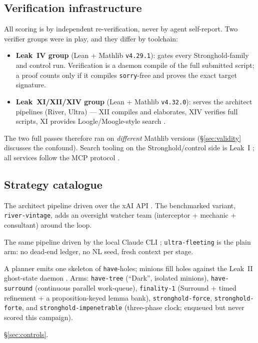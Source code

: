 \documentclass[12pt, a4paper]{article}
\newcommand{\run}[1]{\texttt{#1}}
\begin{document}
\subsection{Verification infrastructure}
\label{sec:verifiers}

All scoring is by independent re-verification, never by agent self-report.
Two verifier groups were in play, and they differ by toolchain:

\begin{itemize}[itemsep=1pt]
  \item \textbf{Leak~IV group} (Lean + Mathlib \texttt{v4.29.1}): gates every
        Stronghold-family and control run. Verification is a daemon compile of
        the full submitted script; a proof counts only if it compiles
        \texttt{sorry}-free and proves the exact target signature.
  \item \textbf{Leak~XI/XII/XIV group} (Lean + Mathlib \texttt{v4.32.0}):
        serves the architect pipelines (River, Ultra) --- XII compiles and
        elaborates, XIV verifies full scripts, XI provides Loogle/Moogle-style
        search \cite{loogle,moogle}.
\end{itemize}

\noindent
The two full passes therefore ran on \emph{different} Mathlib versions
(\S\ref{sec:validity} discusses the confound). Search tooling on the
Stronghold/control side is Leak~I \cite{loogle}; all services follow the
MCP protocol \cite{anthropic2024mcp}.

\subsection{Strategy catalogue}
\label{sec:strategies}

\begin{description}[itemsep=2pt]
  \item[River (Grok driver).] The architect pipeline driven over the xAI API
        \cite{xai2025grok41}. The benchmarked variant, \run{river-vintage},
        adds an oversight watcher team (interceptor + mechanic + consultant)
        around the loop.
  \item[Ultra (Claude CLI driver).] The same pipeline driven by the local
        Claude CLI \cite{anthropic2026sonnet5}; \run{ultra-fleeting} is the
        plain arm: no dead-end ledger, no NL seed, fresh context per stage.
  \item[Stronghold (flat-skeleton family).] A planner emits one skeleton of
        \texttt{have}-holes; minions fill holes against the Leak~II ghost-state
        daemon \cite{shen2026snapshot}. Arms: \run{have-tree} (``Dark'',
        isolated minions), \run{have-surround} (continuous parallel work-queue),
        \run{finality-1} (Surround + timed refinement + a proposition-keyed
        lemma bank), \run{stronghold-force}, \run{stronghold-forte}, and
        \run{stronghold-impenetrable} (three-phase clock; enqueued but never
        scored this campaign).
  \item[Controls.] \S\ref{sec:controls}.
\end{description}
\end{document}
